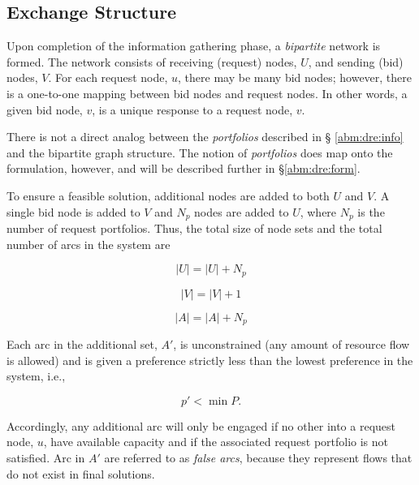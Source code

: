 \subsection{Exchange Structure}

Upon completion of the information gathering phase, a \textit{bipartite} network
is formed. The network consists of receiving (request) nodes, $U$, and sending
(bid) nodes, $V$. For each request node, $u$, there may be many bid nodes;
however, there is a one-to-one mapping between bid nodes and request nodes. In
other words, a given bid node, $v$, is a unique response to a request node, $v$.


There is not a direct analog between the \textit{portfolios} described in \S
\ref{abm:dre:info} and the bipartite graph structure. The notion of
\textit{portfolios} does map onto the formulation, however, and will be
described further in \S \ref{abm:dre:form}.

To ensure a feasible solution, additional nodes are added to both $U$
and $V$. A single bid node is added to $V$ and $N_{p}$ nodes are added to $U$,
where $N_{p}$ is the number of request portfolios. Thus, the total size of node
sets and the total number of arcs in the system are

\begin{equation}
  \left|{U}\right| = \left|{U}\right| + N_{p}
\end{equation}

\begin{equation}
  \left|{V}\right| = \left|{V}\right| + 1
\end{equation}

\begin{equation}
  \left|{A}\right| = \left|{A}\right| + N_{p}
\end{equation}

Each arc in the additional set, $A'$, is unconstrained (any amount of resource
flow is allowed) and is given a preference strictly less than the lowest
preference in the system, i.e.,

\begin{equation}
  p' < \min P.
\end{equation}

Accordingly, any additional arc will only be engaged if no other into a request
node, $u$, have available capacity and if the associated request portfolio is
not satisfied. Arc in $A'$ are referred to as \textit{false arcs}, because they
represent flows that do not exist in final solutions.

